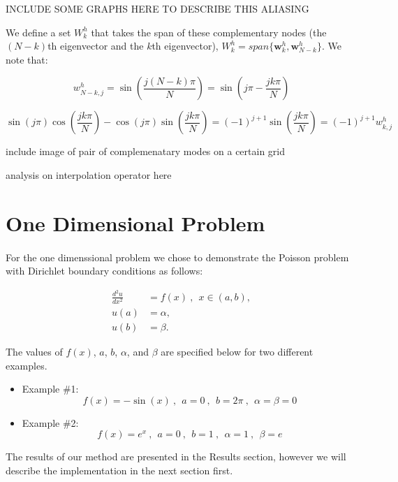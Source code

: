 \documentclass[pdftex,12pt,a4paper]{article}
\begin{document}
INCLUDE SOME GRAPHS HERE TO DESCRIBE THIS ALIASING

We define a set $W_k^h$ that takes the span of these complementary nodes (the $(N-k)$th eigenvector and the $k$th eigenvector), $W_k^h = span \{ \mathbf{w}_k^h, \mathbf{w}_{N-k}^h\}$.  We note that: 

$$
w_{N-k, j}^h = \sin \left( \frac{j (N - k) \pi}{N} \right) = \sin\left( j\pi - \frac{jk \pi}{N}\right)
$$

$$
\sin(j \pi) \cos \left( \frac{jk \pi}{N} \right) - \cos(j \pi) \sin\left( \frac{jk \pi}{N} \right) =  (-1)^{j+1}\sin\left( \frac{jk \pi}{N} \right) = (-1)^{j+1} w_{k, j}^h
$$

include image of pair of complemenatary modes on a certain grid


analysis on interpolation operator here














\section{One Dimensional Problem}
    
    \paragraph*{} For the one dimenssional problem we chose to demonstrate the Poisson problem with Dirichlet boundary conditions as follows:
    
    \begin{equation}
    \begin{aligned}
        \frac{d^2u}{dx^2} &= f(x) ~ , ~~ x \in (a, b), \\
        u(a) &= \alpha, \\
        u(b) &= \beta.
    \end{aligned}
    \end{equation}
    
    The values of $f(x)$, $a$, $b$, $\alpha$, and $\beta$ are specified below for two different examples. \\
    \begin{itemize}
        \item Example \#1: 
            \begin{equation*}
                f(x) = -\sin(x) ~ , ~~ a = 0 ~ , ~~ b = 2 \pi ~ , ~~ \alpha = \beta = 0
            \end{equation*}
        \item Example \#2: 
            \begin{equation*}
                f(x) = e^x ~ , ~~ a = 0 ~ , ~~ b = 1 ~ , ~~ \alpha = 1 ~ , ~~ \beta = e
            \end{equation*}
    \end{itemize}
    The results of our method are presented in the Results section, however we will describe the implementation in the next section first.
\end{document}
